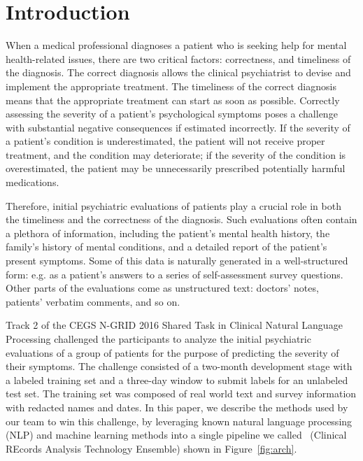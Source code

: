 \chapter{Introduction}\label{sec:intro}

When a medical professional diagnoses a patient who is seeking help for mental health-related issues, there are two 
critical factors: correctness, and timeliness of the diagnosis. The correct diagnosis 
allows the clinical psychiatrist to devise and implement the appropriate
treatment. The timeliness of the correct diagnosis means that the appropriate treatment can start as soon as possible. 
Correctly assessing the severity of a patient's psychological symptoms poses a challenge with substantial negative consequences if estimated incorrectly.
If the severity of a patient's condition
is underestimated, the patient will not receive proper treatment, and the condition
may deteriorate; if the severity of the condition is overestimated, the
patient may be unnecessarily prescribed potentially harmful medications.

Therefore, initial psychiatric evaluations of patients play a crucial role in 
both the timeliness and the correctness of the diagnosis. Such evaluations 
often contain a plethora of information, including the patient's mental health history, the family's history of mental conditions, and a detailed report of the patient's 
present symptoms. Some of this data is naturally generated in a well-structured form: e.g. as a patient's answers to a series of self-assessment survey questions.
Other parts of the evaluations come as unstructured text: doctors' notes, patients' verbatim comments, and so on.

Track 2 of the CEGS N-GRID 2016 Shared Task in Clinical Natural Language Processing
challenged the participants to 
analyze the initial psychiatric evaluations of a group of patients for the purpose of predicting the severity of their symptoms. The challenge consisted of a two-month development stage with a labeled training set and a three-day window to submit labels for an unlabeled test set. The training set was composed of real world text and survey information with redacted names and dates. 
In this paper, we describe the methods used by our team to win this challenge, by leveraging known natural language processing (NLP) and machine learning methods into a
single pipeline we called \CREATE\ (Clinical REcords Analysis Technology Ensemble) shown in Figure~\ref{fig:arch}.

